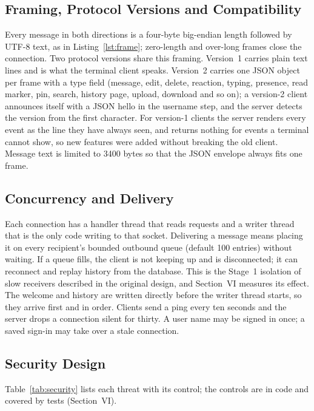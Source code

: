 \documentclass[conference]{IEEEtran}
\begin{document}
\subsection{Framing, Protocol Versions and Compatibility}
Every message in both directions is a four-byte big-endian length followed by UTF-8 text, as in Listing~\ref{lst:frame}; zero-length and over-long frames close the connection. Two protocol versions share this framing. Version~1 carries plain text lines and is what the terminal client speaks. Version~2 carries one JSON object per frame with a type field (message, edit, delete, reaction, typing, presence, read marker, pin, search, history page, upload, download and so on); a version-2 client announces itself with a JSON hello in the username step, and the server detects the version from the first character. For version-1 clients the server renders every event as the line they have always seen, and returns nothing for events a terminal cannot show, so new features were added without breaking the old client. Message text is limited to 3400 bytes so that the JSON envelope always fits one frame.

\subsection{Concurrency and Delivery}
Each connection has a handler thread that reads requests and a writer thread that is the only code writing to that socket. Delivering a message means placing it on every recipient's bounded outbound queue (default 100 entries) without waiting. If a queue fills, the client is not keeping up and is disconnected; it can reconnect and replay history from the database. This is the Stage~1 isolation of slow receivers described in the original design, and Section~VI measures its effect. The welcome and history are written directly before the writer thread starts, so they arrive first and in order. Clients send a ping every ten seconds and the server drops a connection silent for thirty. A user name may be signed in once; a saved sign-in may take over a stale connection.

\subsection{Security Design}
Table~\ref{tab:security} lists each threat with its control; the controls are in code and covered by tests (Section~VI).
\end{document}
